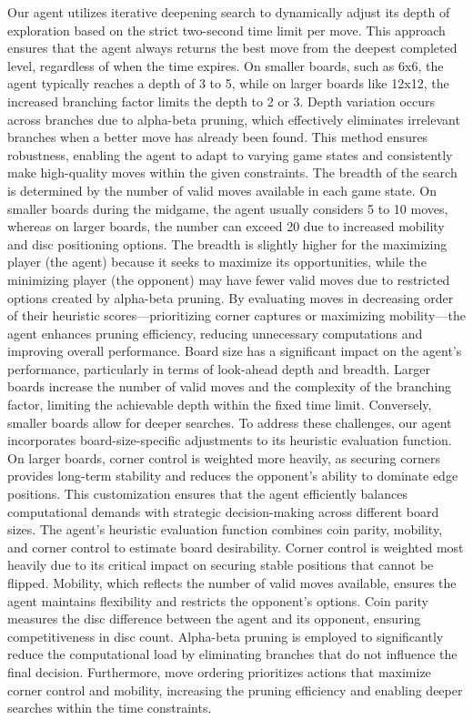 \documentclass[11pt]{article}
\begin{document}
Our agent utilizes iterative deepening search to dynamically adjust its depth of exploration based on the strict two-second time limit per move. This approach ensures that the agent always returns the best move from the deepest completed level, regardless of when the time expires. On smaller boards, such as 6x6, the agent typically reaches a depth of 3 to 5, while on larger boards like 12x12, the increased branching factor limits the depth to 2 or 3. Depth variation occurs across branches due to alpha-beta pruning, which effectively eliminates irrelevant branches when a better move has already been found. This method ensures robustness, enabling the agent to adapt to varying game states and consistently make high-quality moves within the given constraints.
The breadth of the search is determined by the number of valid moves available in each game state. On smaller boards during the midgame, the agent usually considers 5 to 10 moves, whereas on larger boards, the number can exceed 20 due to increased mobility and disc positioning options. The breadth is slightly higher for the maximizing player (the agent) because it seeks to maximize its opportunities, while the minimizing player (the opponent) may have fewer valid moves due to restricted options created by alpha-beta pruning. By evaluating moves in decreasing order of their heuristic scores—prioritizing corner captures or maximizing mobility—the agent enhances pruning efficiency, reducing unnecessary computations and improving overall performance.
Board size has a significant impact on the agent's performance, particularly in terms of look-ahead depth and breadth. Larger boards increase the number of valid moves and the complexity of the branching factor, limiting the achievable depth within the fixed time limit. Conversely, smaller boards allow for deeper searches. To address these challenges, our agent incorporates board-size-specific adjustments to its heuristic evaluation function. On larger boards, corner control is weighted more heavily, as securing corners provides long-term stability and reduces the opponent's ability to dominate edge positions. This customization ensures that the agent efficiently balances computational demands with strategic decision-making across different board sizes.
The agent's heuristic evaluation function combines coin parity, mobility, and corner control to estimate board desirability. Corner control is weighted most heavily due to its critical impact on securing stable positions that cannot be flipped. Mobility, which reflects the number of valid moves available, ensures the agent maintains flexibility and restricts the opponent’s options. Coin parity measures the disc difference between the agent and its opponent, ensuring competitiveness in disc count. Alpha-beta pruning is employed to significantly reduce the computational load by eliminating branches that do not influence the final decision. Furthermore, move ordering prioritizes actions that maximize corner control and mobility, increasing the pruning efficiency and enabling deeper searches within the time constraints.
\end{document}
